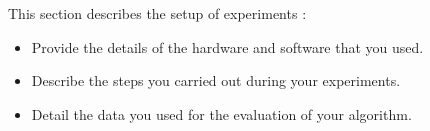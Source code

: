 {\color{red}
This section describes the setup of experiments \cite{zobel2014experimentation}:

\begin{itemize}
	\item Provide the details of the hardware and software that you used.
	\item Describe the steps you carried out during your experiments.
	\item Detail the data you used for the evaluation of your algorithm.
\end{itemize}
}

\lipsum[4]
